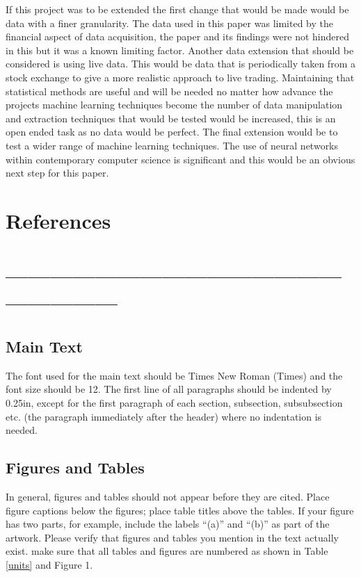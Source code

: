 \documentclass[conference]{IEEEtran}
\begin{document}
If this project was to be extended the first change that would be made would be data with a finer granularity. The data used in this paper was limited by the financial aspect of data acquisition, the paper and its findings were not hindered in this but it was a known limiting factor. Another data extension that should be considered is using live data. This would be data that is periodically taken from a stock exchange to give a more realistic approach to live trading. Maintaining that statistical methods are useful and will be needed no matter how advance the projects machine learning techniques become the number of data manipulation and extraction techniques that would be tested would be increased, this is an open ended task as no data would be perfect. The final extension would be to test a wider range of machine learning techniques. The use of neural networks within contemporary computer science is significant and this would be an obvious next step for this paper.

\iffalse
#################################################################################
\fi

\section{References}



\nocite{*}

\iffalse
#################################################################################
\fi

\iffalse
\section*{------------------------------------------------------------}

\subsection{Main Text}

The font used for the main text should be Times New Roman (Times) and the font size should be 12.  The first line of all paragraphs should be indented by 0.25in, except for the first paragraph of each section, subsection, subsubsection etc. (the paragraph immediately after the header) where no indentation is needed.

\subsection{Figures and Tables}
In general, figures and tables should not appear before they are cited.  Place figure captions below the figures; place table titles above the tables.  If your figure has two parts, for example, include the labels ``(a)'' and ``(b)'' as part of the artwork.  Please verify that figures and tables you mention in the text actually exist.  make sure that all tables and figures are numbered as shown in Table \ref{units} and Figure 1.
\end{document}
